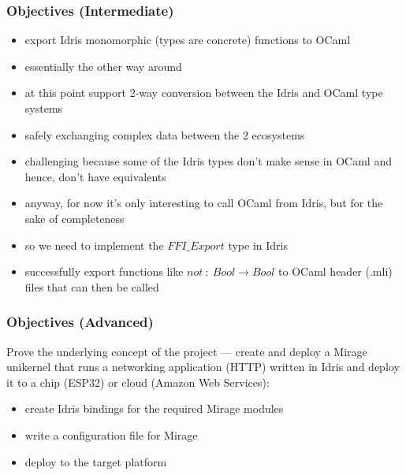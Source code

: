 \documentclass{beamer}
\begin{document}
\begin{frame}
	\frametitle{Objectives (Intermediate)}

	\begin{itemize}
		\item export Idris monomorphic (types are concrete) functions
		      to OCaml
		\item essentially the other way around
		\item at this point support 2-way conversion between
		      the Idris and OCaml type systems
		\item safely exchanging complex data between the 2 ecosystems
		\item challenging because some of the Idris types don't make
		      sense in OCaml and hence, don't have equivalents
		\item anyway, for now it's only interesting to call OCaml
		      from Idris, but for the sake of completeness
		\item so we need to implement the $FFI\_Export$ type in Idris
		\item successfully export functions like
		      $not \ : \ Bool \rightarrow Bool$ to OCaml header (.mli)
		      files that can then be called
	\end{itemize}
\end{frame}


\begin{frame}
	\frametitle{Objectives (Advanced)}

	Prove the underlying concept of the project --- create and deploy a Mirage unikernel that runs a networking
	application (HTTP) written in Idris and deploy it to a chip (ESP32) or cloud (Amazon Web Services):

	\begin{itemize}
		\item create Idris bindings for the required Mirage modules
		\item write a configuration file for Mirage
		\item deploy to the target platform
	\end{itemize}
\end{frame}
\end{document}

